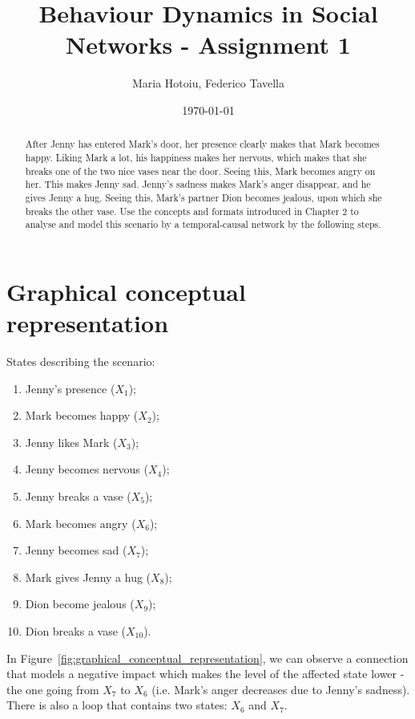 \documentclass[a4paper]{article}
\title{Behaviour Dynamics in Social Networks - Assignment 1}
\author{Maria Hotoiu, Federico Tavella}
\date{\today}
\begin{document}
\maketitle

\begin{abstract}
After Jenny has entered Mark’s door, her presence clearly makes that Mark becomes happy. Liking Mark a lot, his happiness makes her nervous, which makes that she breaks one of the two nice vases near the door. Seeing this, Mark becomes angry on her. This makes Jenny sad. Jenny’s sadness makes Mark’s anger disappear, and he gives Jenny a hug. Seeing this, Mark’s partner Dion becomes jealous, upon which she breaks the other vase.
\newline
Use the concepts and formats introduced in Chapter 2 to analyse and model this scenario by a temporal-causal network by the following steps.
\end{abstract}

\section{Graphical conceptual representation}
\label{sec:graphical_conceptual_representation}

States describing the scenario:

\begin{enumerate}
\item Jenny's presence ($X_1$);
\item Mark becomes happy ($X_2$);
\item Jenny likes Mark ($X_3$);
\item Jenny becomes nervous ($X_4$);
\item Jenny breaks a vase ($X_5$);
\item Mark becomes angry ($X_6$);
\item Jenny becomes sad ($X_7$);
\item Mark gives Jenny a hug ($X_8$);
\item Dion become jealous ($X_9$);
\item Dion breaks a vase ($X_10$).
\end{enumerate}

In Figure~\ref{fig:graphical_conceptual_representation}, we can observe a connection that models a negative impact which makes the level of the affected state lower - the one going from $X_7$ to $X_6$ (i.e. Mark's anger decreases due to Jenny's sadness). There is also a loop that contains two states: $X_6$ and $X_7$.
\end{document}
